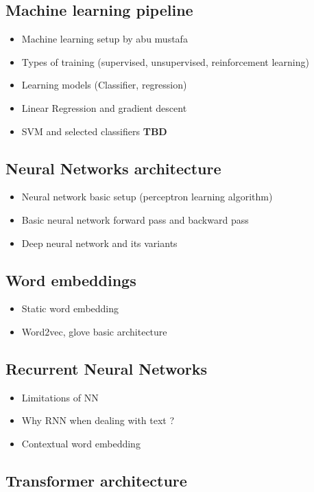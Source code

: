 \subsection{Machine learning pipeline}
    \begin{itemize}
        \item Machine learning setup by abu mustafa 
        \item Types of training (supervised, unsupervised, reinforcement learning)
        \item Learning models (Classifier, regression)
        \item Linear Regression and gradient descent 
        \item SVM and selected classifiers \textbf{TBD}
    \end{itemize}
\subsection{Neural Networks architecture}
    \begin{itemize}
        \item Neural network basic setup (perceptron learning algorithm)
        \item Basic neural network forward pass and backward pass
        \item  Deep neural network and its variants
    \end{itemize}
\subsection{Word embeddings}
    \begin{itemize}
        \item Static word embedding
        \item Word2vec, glove basic architecture
    \end{itemize}
\subsection{Recurrent Neural Networks}
    \begin{itemize}
        \item Limitations of NN 
        \item Why RNN when dealing with text ?
        \item Contextual word embedding
    \end{itemize}
\subsection{Transformer architecture}
